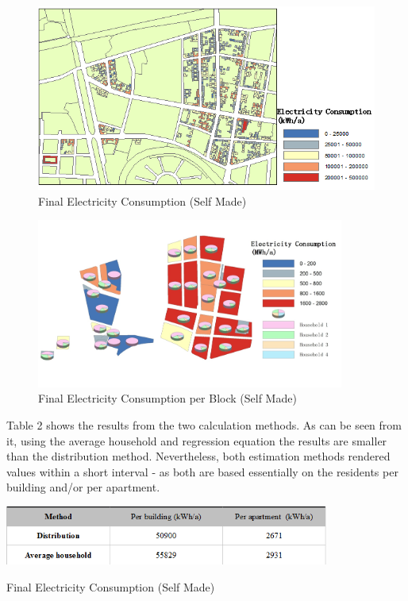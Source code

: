 \begin{figure}[H]
	\centering
	\includegraphics[width=1\textwidth]{phase2/group3/fig17.png}
	\caption{Final Electricity Consumption (Self Made)}
	\label{fig:figure17}
\end{figure}
\begin{figure}[H]
	\centering
	\includegraphics[width=0.9\textwidth]{phase2/group3/fig19.png}
	\caption{Final Electricity Consumption per Block (Self Made)}
	\label{fig:figure19}
\end{figure}
Table 2 shows the results from the two calculation methods. As can be seen from it, using the average household and regression equation the results are smaller than the distribution method. Nevertheless, both estimation methods rendered values within a short interval - as both are based essentially on the residents per building and/or per apartment. 


\begin{table}[H]
	\centering
	\includegraphics[width=0.8\textwidth]{phase2/group3/fig18.PNG}
	\caption{Final Electricity Consumption (Self Made)}
	\label{fig:figure18}
\end{table}



